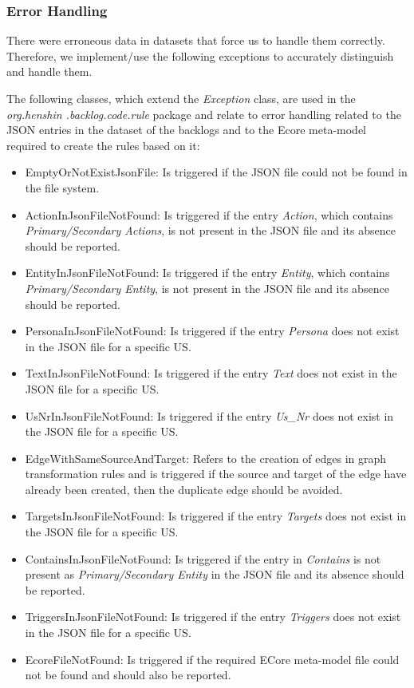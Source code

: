 \subsubsection*{Error Handling}
There were erroneous data in datasets that force us to handle them correctly. Therefore, we implement/use the following exceptions to accurately distinguish and handle them.

The following classes, which extend the \textit{Exception} class, are used in the \textit{org.henshin .backlog.code.rule} package and relate to error handling related to the JSON entries in the dataset of the backlogs and to the Ecore meta-model required to create the rules based on it:
\begin{itemize}
	\item EmptyOrNotExistJsonFile: Is triggered if the JSON file could not be found in the file system.
	
	\item ActionInJsonFileNotFound: Is triggered if the entry \textit{Action}, which contains \textit{Primary/Secondary Actions}, is not present in the JSON file and its absence should be reported.
	
	\item EntityInJsonFileNotFound: Is triggered if the entry \textit{Entity}, which contains \textit{Primary/Secondary Entity}, is not present in the JSON file and its absence should be reported.
	
	\item PersonaInJsonFileNotFound: Is triggered if the entry \textit{Persona} does not exist in the JSON file for a specific US.
	
	\item TextInJsonFileNotFound: Is triggered if the entry \textit{Text} does not exist in the JSON file for a specific US. 
	
	\item UsNrInJsonFileNotFound: Is triggered if the entry \textit{Us\_Nr} does not exist in the JSON file for a specific US.

	\item EdgeWithSameSourceAndTarget: Refers to the creation of edges in graph transformation rules and is triggered if the source and target of the edge have already been created, then the duplicate edge should be avoided.
		
	\item TargetsInJsonFileNotFound: Is triggered if the entry \textit{Targets} does not exist in the JSON file for a specific US.
	
	\item ContainsInJsonFileNotFound: Is triggered if the entry in \textit{Contains} is not present as \textit{Primary/Secondary Entity} in the JSON file and its absence should be reported.
	
	\item TriggersInJsonFileNotFound: Is triggered if the entry \textit{Triggers} does not exist in the JSON file for a specific US. 
	
	\item EcoreFileNotFound: Is triggered if the required ECore meta-model file could not be found and should also be reported.
\end{itemize}
